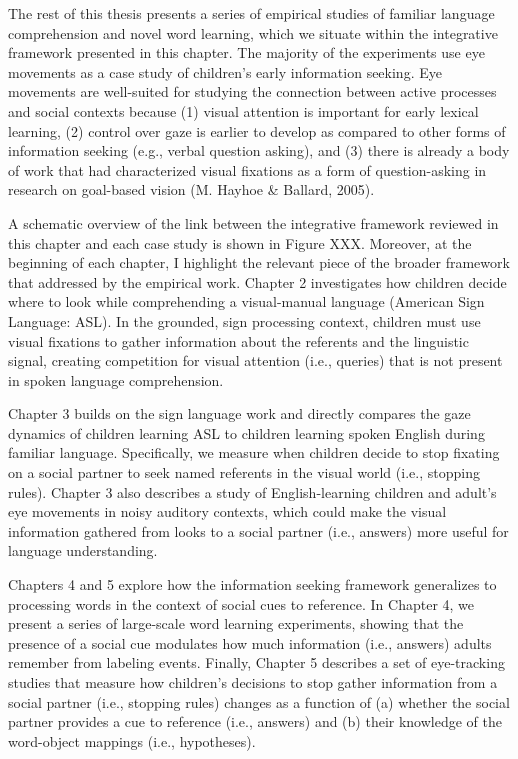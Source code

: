 \documentclass[oneside]{report}
\begin{document}
The rest of this thesis presents a series of empirical studies of
familiar language comprehension and novel word learning, which we
situate within the integrative framework presented in this chapter. The
majority of the experiments use eye movements as a case study of
children's early information seeking. Eye movements are well-suited for
studying the connection between active processes and social contexts
because (1) visual attention is important for early lexical learning,
(2) control over gaze is earlier to develop as compared to other forms
of information seeking (e.g., verbal question asking), and (3) there is
already a body of work that had characterized visual fixations as a form
of question-asking in research on goal-based vision (M. Hayhoe \&
Ballard, 2005).

A schematic overview of the link between the integrative framework
reviewed in this chapter and each case study is shown in Figure XXX.
Moreover, at the beginning of each chapter, I highlight the relevant
piece of the broader framework that addressed by the empirical work.
Chapter 2 investigates how children decide where to look while
comprehending a visual-manual language (American Sign Language: ASL). In
the grounded, sign processing context, children must use visual
fixations to gather information about the referents and the linguistic
signal, creating competition for visual attention (i.e., queries) that
is not present in spoken language comprehension.

Chapter 3 builds on the sign language work and directly compares the
gaze dynamics of children learning ASL to children learning spoken
English during familiar language. Specifically, we measure when children
decide to stop fixating on a social partner to seek named referents in
the visual world (i.e., stopping rules). Chapter 3 also describes a
study of English-learning children and adult's eye movements in noisy
auditory contexts, which could make the visual information gathered from
looks to a social partner (i.e., answers) more useful for language
understanding.

Chapters 4 and 5 explore how the information seeking framework
generalizes to processing words in the context of social cues to
reference. In Chapter 4, we present a series of large-scale word
learning experiments, showing that the presence of a social cue
modulates how much information (i.e., answers) adults remember from
labeling events. Finally, Chapter 5 describes a set of eye-tracking
studies that measure how children's decisions to stop gather information
from a social partner (i.e., stopping rules) changes as a function of
(a) whether the social partner provides a cue to reference (i.e.,
answers) and (b) their knowledge of the word-object mappings (i.e.,
hypotheses).
\end{document}
